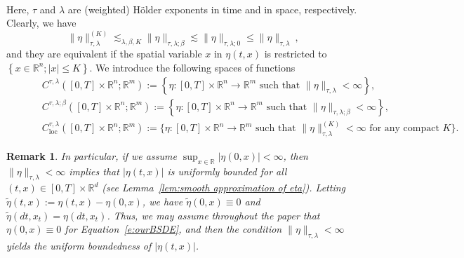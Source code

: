 \documentclass[11pt,reqno]{amsart}
\def\R{\mathbb R}
\newtheorem{remark}{Remark}[section]
\numberwithin{equation}{section}
\begin{document}
\begin{itemize}
\begin{equation*}
\begin{aligned}
\end{aligned}
\end{equation*}
Here, $\tau$ and $\lambda$ are (weighted) H\"older  exponents in time and in space, respectively. Clearly, we have 
\begin{equation}\label{e:tau,lambda;0}
\|\eta\|^{(K)}_{\tau,\lambda}\lesssim_{\lambda,\beta,K} \|\eta\|_{\tau,\lambda; \beta} \lesssim\|\eta\|_{\tau,\lambda;0} \le  \|\eta\|_{\tau,\lambda}\ ,
\end{equation}
and they are equivalent if the spatial variable $x$ in $\eta(t,x)$ is restricted to $\left\{x\in\mathbb{R}^{n};|x|\le K\right\}$. 
We introduce the following spaces of functions
\begin{equation*}
\begin{split}
&\ \ \ \ \ \ \ \ \ \ \  C^{\tau,\lambda}([0,T]\times\mathbb{R}^{n};\mathbb{R}^{m}):=\left\{\eta: [0,T]\times \mathbb{R}^{n}\rightarrow \mathbb{R}^{m}\text{ such that }\|\eta\|_{\tau,\lambda}<\infty\right\},\\
&\ \ \ \ \ \ \ \ \ \ \  C^{\tau,\lambda;\beta}([0,T]\times\mathbb{R}^{n};\mathbb{R}^{m}):=\left\{\eta: [0,T]\times \mathbb{R}^{n}\rightarrow \mathbb{R}^{m}\text{ such that }\|\eta\|_{\tau,\lambda;\beta}<\infty\right\},\\
&\ \ \ \ \ \ \ \ \ \ \  C^{\tau,\lambda}_{\text{loc}}([0,T]\times \mathbb{R}^{n};\mathbb{R}^{m}):=\Big\{\eta:[0,T]\times\mathbb{R}^{n}\rightarrow\mathbb{R}^{m}  \text{ such that }\|\eta\|^{(K)}_{\tau,\lambda}<\infty  \text{ for any compact } K \Big\}.   
\end{split}    
\end{equation*}
 
\begin{remark}\label{rem:eta}
In particular, if we assume  $\sup_{x\in \R}|\eta(0,x)|< \infty$, then $ \|\eta\|_{\tau,\lambda}<\infty$ implies that $|\eta(t,x)|$ is uniformly bounded for all $(t,x)\in[0,T]\times \R^d$ (see Lemma~\ref{lem:smooth approximation of eta}). Letting $\tilde \eta(t,x):=\eta(t, x)-\eta(0, x)$,  we have $\tilde \eta(0,x)\equiv0$ and  $\tilde \eta(dt, x_t) =\eta(dt, x_t)$. Thus, we may assume throughout the paper that $\eta(0,x)\equiv 0$ for Equation~\eqref{e:ourBSDE}, and then the condition $\|\eta\|_{\tau, \lambda}<\infty$ yields the uniform boundedness of $|\eta(t,x)|$.
\end{remark}


\end{itemize}
\end{document}
